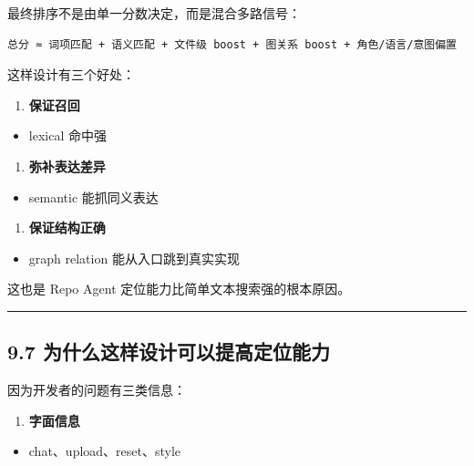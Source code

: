 \documentclass[UTF8,12pt,openany]{ctexbook}
\begin{document}
最终排序不是由单一分数决定，而是混合多路信号：\par

\begin{lstlisting}
总分 ≈ 词项匹配 + 语义匹配 + 文件级 boost + 图关系 boost + 角色/语言/意图偏置
\end{lstlisting}

这样设计有三个好处：\par

\begin{enumerate}
\item \textbf{保证召回}
\end{enumerate}
\begin{itemize}
\item lexical 命中强
\end{itemize}

\begin{enumerate}
\item \textbf{弥补表达差异}
\end{enumerate}
\begin{itemize}
\item semantic 能抓同义表达
\end{itemize}

\begin{enumerate}
\item \textbf{保证结构正确}
\end{enumerate}
\begin{itemize}
\item graph relation 能从入口跳到真实实现
\end{itemize}

这也是 Repo Agent 定位能力比简单文本搜索强的根本原因。\par

\hrule

\subsection{9.7 为什么这样设计可以提高定位能力}

因为开发者的问题有三类信息：\par

\begin{enumerate}
\item \textbf{字面信息}
\end{enumerate}
\begin{itemize}
\item chat、upload、reset、style
\end{itemize}
\end{document}
